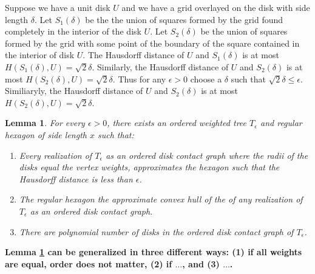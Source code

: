 \documentclass[10pt]{CSUNthesis}
\theoremstyle{plain}%
\newtheorem{lem}{Lemma}
\theoremstyle{definition}
\theoremstyle{remark}
\newtheorem{prob}{Problem}
\newcommand{\lr}[1]{\left( #1 \right)}
\begin{document}
Suppose we have a unit disk $U$ and we have a grid overlayed on the disk with side length $\delta$.  
Let $S_1(\delta)$ be the the union of squares formed by the grid found completely in the interior of the disk $U$.  
Let $S_2(\delta)$ be the union of squares formed by the grid with some point of the boundary of the square contained in the interior of disk $U$.  
The Hausdorff distance of $U$ and $S_1(\delta)$ is at most $H\lr{S_1(\delta), U}=\sqrt{2}\delta$.  
Similarly, the Hausdorff distance of $U$ and $S_2(\delta)$ is at most $H\lr{S_2(\delta), U}=\sqrt{2}\delta$.
Thus for any $\epsilon>0$  choose a $\delta$ such that $\sqrt{2}\delta \leq \epsilon$.  
Similiaryly, the Hausdorff distance of $U$ and $S_2(\delta)$ is at most $H\lr{S_2(\delta), U}=\sqrt{2}\delta$.



\begin{lem}\label{lem:ch4IntroLemma}
For every $\epsilon > 0$, there exists an ordered weighted tree $T_\epsilon$ and regular hexagon of side length $x$ such that:
\begin{enumerate}
\item Every realization of $T_\epsilon$ as an ordered disk contact graph where the radii of the disks equal the vertex weights, approximates the hexagon such that the Hausdorff distance is less than $\epsilon$.
\item The regular hexagon the approximate convex hull of the of any realization of $T_\epsilon$ as an ordered disk contact graph.
\item There are polynomial number of disks in the ordered disk contact graph of $T_\epsilon$.
\end{enumerate}
\end{lem} 
 

\textbf{Lemma \ref{lem:ch4IntroLemma} can be generalized in three different ways: (1) if all weights are equal, order does not matter, (2)
if $\dots$, and (3) $\dots$.}
\end{document}
